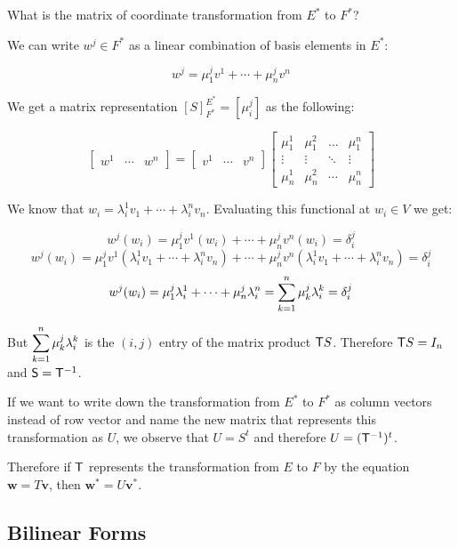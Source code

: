 What is the matrix of coordinate transformation from $E^*$ to $F^*$?

We can write $w^j \in F^*$ as a linear combination of basis elements in $E^*$:


$$w^j=\mu_{1}^{j}v^1+\cdots+\mu_n^{j}v^n$$

We get a matrix representation $[S]_{F^*}^{E^*}=[\mu_{i}^{j}]$ as the following:


$$\begin{bmatrix} w^1 & \cdots & w^n \end{bmatrix}= \begin{bmatrix} v^1 & \cdots & v^n \end{bmatrix}\begin{bmatrix} \mu_1^1 & \mu_1^2 & \dots &\mu_1^n \\ \vdots & \vdots & \ddots & \vdots \\ \mu_n^1 & \mu_n^2 & \cdots & \mu_n^n\end{bmatrix} $$

We know that $w_i = \lambda_{i}^1v_1+\cdots+\lambda_{i}^nv_n$.
Evaluating this functional at $w_i \in V$ we get:

$$w^j(w_i)=\mu_{1}^{j}v^1(w_i)+\cdots+\mu_n^{j}v^n(w_i)=\delta_{i}^j$$
$$w^j(w_i)=\mu_{1}^{j}v^1(\lambda_{i}^1v_1+\cdots+\lambda_{i}^nv_n)+\cdots+\mu_n^{j}v^n(\lambda_{i}^1v_1+\cdots+\lambda_{i}^nv_n)=\delta_{i}^j$$
$$w^j(w_i)=\mu_{1}^{j}\lambda_{i}^1+\cdots+\mu_n^{j}\lambda_{i}^n=\displaystyle\sum_{k=1}^n\mu_{k}^j \lambda_{i}^k=\delta_{i}^j$$

But $\displaystyle\sum_{k=1}^n\mu_{k}^j \lambda_{i}^k$ is the $(i,j)$ entry of the matrix product $\mathsf{T}S$. Therefore $\mathsf{T}S=I_n$ and $\mathsf{S}=\mathsf{T}^{-1}$.

If we want to write down the transformation from $E^*$ to $F^*$ as column vectors instead of row vector and name the new matrix that represents this transformation as $U$, we observe that $U=S^{t}$ and therefore $U=(\mathsf{T}^{-1})^t$.

Therefore if $\mathsf{T}$ represents the transformation from $E$ to $F$ by the equation $\mathbf{w}=T\mathbf{v}$, then $\mathbf{w^*}=U\mathbf{v^*}$.


\subsection{Bilinear Forms}

